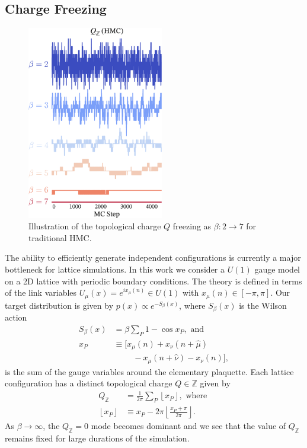 \documentclass[a4paper,11pt]{article}
\begin{document}
\subsection{\label{subsec:qfreezing}Charge Freezing}
%
\begin{figure}
    \vspace{-\baselineskip}
    \centering
    \includegraphics[width=0.53\textwidth]{assets/qfreezing.pdf}
    \caption{\label{fig:qfreezing}Illustration of the topological charge \(Q\)
    freezing as \(\beta : 2 \rightarrow 7\) for traditional HMC.}
\end{figure}
%
The ability to efficiently generate independent configurations is currently
a major bottleneck for lattice simulations.
%
In this work we consider a \(U(1)\) gauge model on a 2D lattice with periodic
boundary conditions.
%
The theory is defined in terms of the link variables \(U_{\mu}(x) = e^{i
x_{\mu}(n)} \in U(1)\) with \(x_{\mu}(n) \in [-\pi, \pi]\).
%
Our target distribution is given by \(p(x)\propto e^{-S_{\beta}(x)}\), where
\(S_{\beta}(x)\) is the Wilson action
%
\begin{align}
    S_{\beta}(x) &= \beta \sum_{P} 1 - \cos{x_{P}}, \text{ and}\\
    x_{P} &\equiv \big[x_{\mu}(n) + x_{\nu}(n + \hat{\mu})\nonumber \\
          &\quad\quad\,\, - x_{\mu}(n+\hat{\nu}) - x_{\nu}(n)\big],\nonumber
\end{align}
%
is the sum of the gauge variables around the elementary plaquette.
%
Each lattice configuration has a distinct topological charge \(Q \in
\mathbb{Z}\) given by
%
\begin{align*}
    Q_{\mathbb{Z}} &= \frac{1}{2\pi}\sum_{P}\left\lfloor x_{P} \right\rfloor,\text{ where } \\
    \left\lfloor x_{P} \right\rfloor &\equiv x_{P} - 2\pi
    \left\lfloor\frac{x_{P}+\pi}{2\pi}\right\rfloor.
\end{align*}
%
As \(\beta \rightarrow \infty\), the \(Q_{\mathbb{Z}} = 0\) mode becomes
dominant and we see that the value of \(Q_\mathbb{Z}\) remains fixed for large
durations of the simulation.
%
\end{document}
